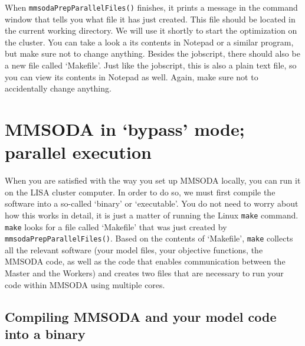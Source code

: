When \texttt{mmsodaPrepParallelFiles()} finishes, it prints a message in the command window that tells you what file it has just created. This file should be located in the current working directory. We will use it shortly to start the optimization on the cluster. You can take a look a its contents in Notepad or a similar program, but make sure not to change anything. Besides the jobscript, there should also be a new file called `Makefile'. Just like the jobscript, this is also a plain text file, so you can view its contents in Notepad as well. Again, make sure not to accidentally change anything.


\section{MMSODA in `bypass' mode; parallel execution}


When you are satisfied with the way you set up MMSODA locally, you can run it on the LISA cluster computer. In order to do so, we must first compile the software into a so-called `binary' or `executable'. You do not need to worry about how this works in detail, it is just a matter of running the Linux \texttt{make} command. \texttt{make} looks for a file called `Makefile' that was just created by \texttt{mmsodaPrepParallelFiles()}. Based on the contents of `Makefile', \texttt{make} collects all the relevant software (your model files, your objective functions, the MMSODA code, as well as the code that enables communication between the Master and the Workers) and creates two files that are necessary to run your code within MMSODA using multiple cores.

\subsection{Compiling MMSODA and your model code into a binary}



